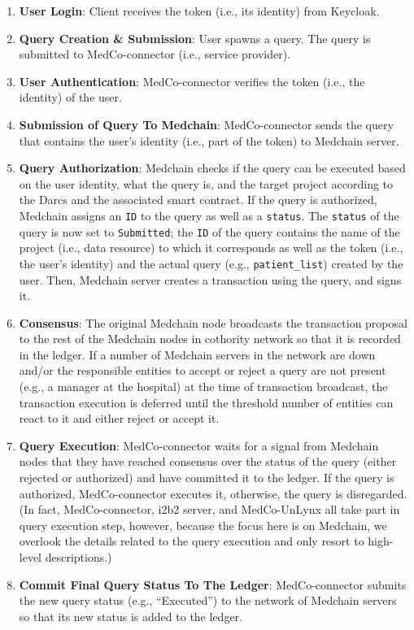 \begin{enumerate}
    \item \textbf{User Login}: Client receives the token (i.e., its identity) from Keycloak.
    
    \item \textbf{Query Creation \& Submission}: User spawns a query. The query is submitted to MedCo-connector (i.e., service provider). 
    
    \item \textbf{User Authentication}: MedCo-connector verifies the token (i.e., the identity) of the user. 
    
    \item \textbf{Submission of Query To Medchain}: MedCo-connector sends the query that contains the user’s identity (i.e., part of the token) to Medchain server.
   
    \item \textbf{Query Authorization}: Medchain checks if the query can be executed based on the user identity, what the query is, and the target project according to the Darcs and the associated smart contract. If the query is authorized, Medchain assigns an \texttt{ID} to the query as well as a \texttt{status}. The \texttt{status} of the query is now set to \texttt{Submitted}; the \texttt{ID} of the query contains the name of the project (i.e., data resource) to which it corresponds as well as the token (i.e., the user’s identity) and the actual query (e.g., \texttt{patient\_list}) created by the user. Then, Medchain server creates a transaction using the query, and signs it. 
    
    \item \textbf{Consensus}: The original Medchain node broadcasts the transaction proposal to the rest of the Medchain nodes in cothority network so that it is recorded in the ledger. If a number of Medchain servers in the network are down and/or the responsible entities to accept or reject a query are not present (e.g., a manager at the hospital) at the time of transaction broadcast, the transaction execution is deferred until the threshold number of entities can react to it and either reject or accept it.  

    \item \textbf{Query Execution}: MedCo-connector waits for a signal from Medchain nodes that they have reached consensus over the status of the query (either rejected or authorized) and have committed it to the ledger. If the query is authorized, MedCo-connector executes it, otherwise, the query is disregarded. (In fact, MedCo-connector, i2b2 server, and MedCo-UnLynx all take part in query execution step, however, because the focus here is on Medchain, we overlook the details related to the query execution and only resort to high-level descriptions.) 
    
    \item \textbf{Commit Final Query Status To The Ledger}: MedCo-connector submits the new query status (e.g., “Executed”) to the network of Medchain servers so that its new status is added to the ledger. 
    
\end{enumerate}
 

